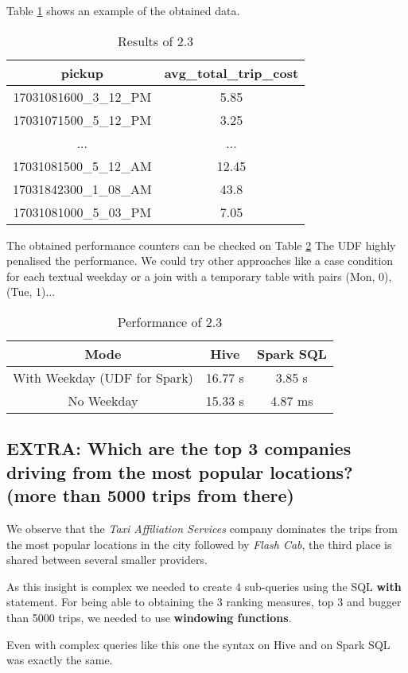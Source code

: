\documentclass[conference,compsoc]{IEEEtran}
\begin{document}
 Table \ref{output_2_3} shows an example of the obtained data. \par


\begin{table}[!t]
\renewcommand{\arraystretch}{1.3}
\caption{Results of 2.3}
\label{output_2_3}
\centering
\begin{tabular}{c||c}
\hline
\bfseries pickup              & \bfseries avg\_total\_trip\_cost\\
\hline\hline
17031081600\_3\_12\_PM & 5.85               \\
17031071500\_5\_12\_PM & 3.25               \\
... & ...   \\
17031081500\_5\_12\_AM & 12.45              \\
17031842300\_1\_08\_AM & 43.8               \\
17031081000\_5\_03\_PM & 7.05               \\
\hline
\end{tabular}
\end{table}

The obtained performance counters can be checked on Table \ref{perf_2_3}
The UDF highly penalised the performance. We could try other approaches like a case condition for each textual weekday or a join with a temporary table with pairs (Mon, 0),(Tue, 1)...
\begin{table}[!t]
\renewcommand{\arraystretch}{1.3}
\caption{Performance of 2.3}
\label{perf_2_3}
\centering
\begin{tabular}{c||c|c}
\hline
\bfseries Mode &\bfseries Hive & \bfseries Spark SQL \\
\hline\hline
With Weekday (UDF for Spark) & 16.77 s         & 3.85 s    \\
No Weekday & 15.33 s  & 4.87 ms \\
\hline
\end{tabular}
\end{table}


\subsection{EXTRA: Which are the top 3 companies driving from the most popular locations? (more than 5000 trips from there)}
We observe that the \textit{Taxi Affiliation Services} company dominates the trips from the most popular locations in the city followed by \textit{Flash Cab}, the third place is shared between several smaller providers. \par
As this insight is complex we needed to create 4 sub-queries using the SQL \textbf{with} statement. For being able to obtaining the 3 ranking measures, top 3 and bugger than 5000 trips, we needed to use \textbf{windowing functions}. \par
Even with complex queries like this one the syntax on Hive and on Spark SQL was exactly the same.
\end{document}
